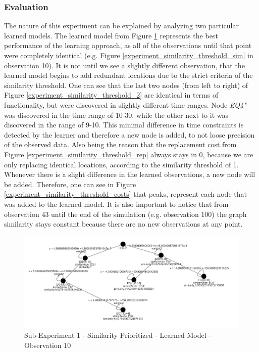 \subsubsection{Evaluation}
The nature of this experiment can be explained by analyzing two particular learned models. The learned model from Figure \ref{experiment_similarity_threshold_1} represents the best performance of the learning approach, as all of the observations until that point were completely identical (e.g. Figure \ref{experiment_similarity_threshold_sim} in observation 10).
%
It is not until we see a slightly different observation, that the learned model begins to add redundant locations due to the strict criteria of the similarity threshold. One can see that the last two nodes (from left to right) of Figure \ref{experiment_similarity_threshold_2} are identical in terms of functionality, but were discovered in slightly different time ranges. Node \textit{EQ4"} was discovered in the time range of 10-30, while the other next to it was discovered in the range of 9-10. This minimal difference in time constraints is detected by the learner and therefore a new node is added, to not loose precision of the observed data.
%
Also being the reason that the replacement cost from Figure \ref{experiment_similarity_threshold_rep} always stays in 0, because we are only replacing identical locations, according to the similarity threshold of 1. Whenever there is a slight difference in the learned observations, a new node will be added. Therefore, one can see in Figure \ref{experiment_similarity_threshold_costs} that peaks, represent each node that was added to the learned model. It is also important to notice that from observation 43 until the end of the simulation (e.g. observation 100) the graph similarity stays constant because there are no new observations at any point. 
%
\newpage

\begin{figure}[h]
	\centering
	\includegraphics[scale=0.38]{./pictures/similarity_experiment/learnedModel_Obs10.png}
	\caption{Sub-Experiment 1 - Similarity Prioritized - Learned Model - Observation 10}
	\label{experiment_similarity_threshold_1}
\end{figure}

